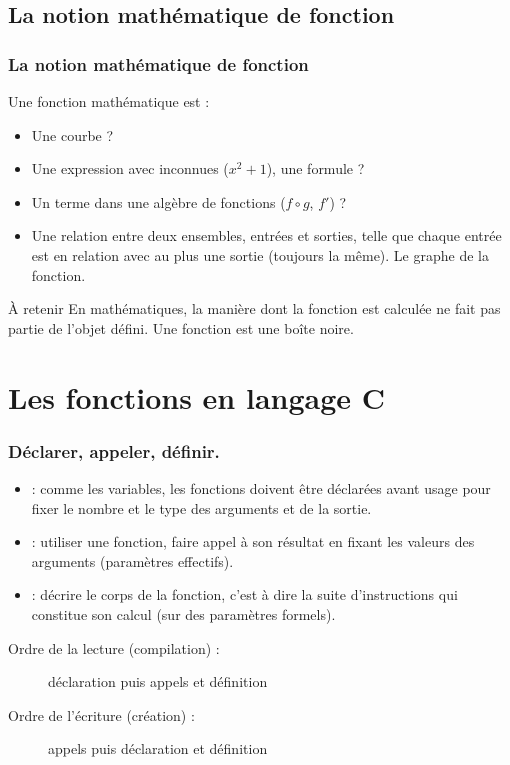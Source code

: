 \documentclass[xcolor=pdftex,svgnames,table]{beamer}
\begin{document}
\subsection{La notion mathématique de fonction}
\begin{frame}
  \frametitle[En maths]{La notion mathématique de
    fonction}
 Une fonction mathématique est :\pause
  \begin{itemize}
  \item Une courbe ?
  \item Une expression avec inconnues ($x^2 + 1$), une formule ?
  \item Un terme dans une algèbre de fonctions ($f\circ g$, $f'$)
    ?\pause
  \item Une relation entre deux ensembles, entrées et sorties, telle
    que chaque entrée est en relation avec au plus une sortie
    (toujours la même). Le graphe de la fonction.
  \end{itemize}
\pause
\begin{block}{À retenir}
  En mathématiques, la manière dont la fonction est calculée ne fait
  pas partie de l'objet défini. Une fonction est une boîte noire.
\end{block}

\end{frame}

\section[En C]{Les fonctions en langage C}
\begin{frame}
\frametitle{Déclarer, appeler, définir.}
\pause
\begin{itemize}
\item {} : comme les variables, les fonctions
  doivent être déclarées avant usage pour fixer \alert{le nombre} et le type
  des arguments et de la sortie.\pause
\item {} : utiliser une fonction, faire appel à son
  résultat en fixant les valeurs des arguments (paramètres effectifs).\pause
\item {} : décrire le corps de la fonction, c'est à
  dire la suite d'instructions qui constitue son calcul (sur des
  paramètres formels).
\end{itemize}\pause
\begin{description}
\item[Ordre de la lecture (compilation) :] déclaration puis appels et définition
\item[Ordre de l'écriture  (création) :] appels puis déclaration et définition
\end{description}


\end{frame}
\end{document}
